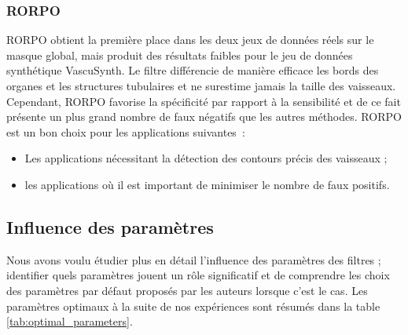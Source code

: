 \subsubsection*{RORPO}

RORPO obtient la première place dans les deux jeux de données réels sur le masque global, mais produit des résultats faibles pour le jeu de données synthétique VascuSynth. Le filtre différencie de manière efficace les bords des organes et les structures tubulaires et ne surestime jamais la taille des vaisseaux. Cependant, RORPO favorise la spécificité par rapport à la sensibilité et de ce fait présente un plus grand nombre de faux négatifs que les autres méthodes. RORPO est un bon choix pour les applications suivantes~:

\begin{itemize}
  \item Les applications nécessitant la détection des contours précis des vaisseaux ;
  \item les applications où il est important de minimiser le nombre de faux positifs. 
\end{itemize}

\subsection{Influence des paramètres}

Nous avons voulu étudier plus en détail l'influence des paramètres des filtres ; identifier quels paramètres jouent un rôle significatif et de comprendre les choix des paramètres par défaut proposés par les auteurs lorsque c'est le cas. Les paramètres optimaux à la suite de nos expériences sont résumés dans la table \ref{tab:optimal_parameters}.


